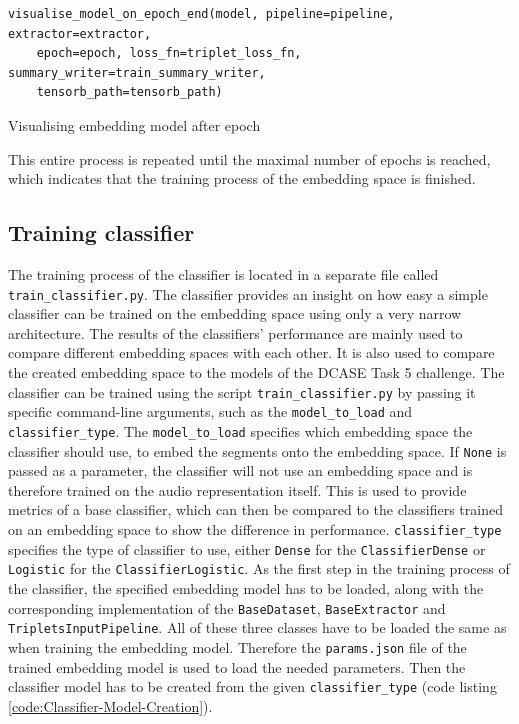 \begin{code}[H]
\begin{verbatim}
visualise_model_on_epoch_end(model, pipeline=pipeline, extractor=extractor, 
    epoch=epoch, loss_fn=triplet_loss_fn, summary_writer=train_summary_writer, 
    tensorb_path=tensorb_path)
\end{verbatim}
\caption{Visualising embedding model after epoch}
\label{code:Visualising-Embedding-Model}
\end{code}
\noindent
This entire process is repeated until the maximal number of epochs is reached, which indicates that the training process of the embedding space is finished.

\subsection{Training classifier}
\label{sub:Training-Classifier}
The training process of the classifier is located in a separate file called \texttt{train\_classifier.py}. The classifier provides an insight on how easy a simple classifier can be trained on the embedding space using only a very narrow architecture. The results of the classifiers' performance are mainly used to compare different embedding spaces with each other. It is also used to compare the created embedding space to the models of the \gls{DCASE} Task 5 challenge.
\newline
\newline
The classifier can be trained using the script \texttt{train\_classifier.py} by passing it specific command-line arguments, such as the \texttt{model\_to\_load} and \texttt{classifier\_type}. The \texttt{model\_to\_load} specifies which embedding space the classifier should use, to embed the segments onto the embedding space. If \texttt{None} is passed as a parameter, the classifier will not use an embedding space and is therefore trained on the audio representation itself. This is used to provide metrics of a \flqq base classifier\frqq, which can then be compared to the classifiers trained on an embedding space to show the difference in performance. \texttt{classifier\_type} specifies the type of classifier to use, either \texttt{Dense} for the \texttt{ClassifierDense} or \texttt{Logistic} for the \texttt{ClassifierLogistic}.
\newline
\newline
As the first step in the training process of the classifier, the specified embedding model has to be loaded, along with the corresponding implementation of the \texttt{BaseDataset}, \texttt{BaseExtractor} and \texttt{TripletsInputPipeline}. All of these three classes have to be loaded the same as when training the embedding model. Therefore the \texttt{params.json} file of the trained embedding model is used to load the needed parameters. Then the classifier model has to be created from the given \texttt{classifier\_type} (code listing \ref{code:Classifier-Model-Creation}).

